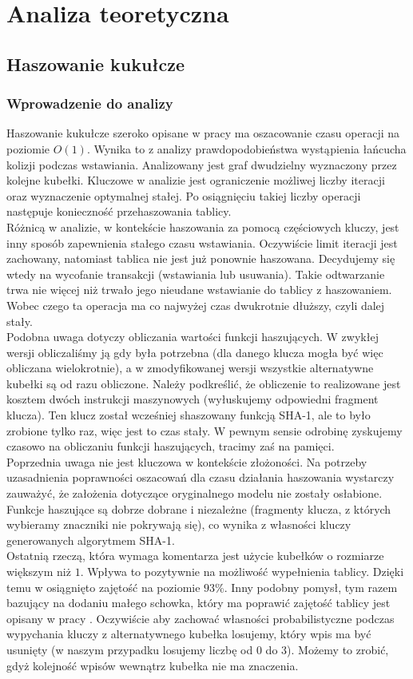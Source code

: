 \documentclass[declaration,shortabstract,masc]{iithesis}
\begin{document}
	\chapter{Analiza teoretyczna}
		\section{Haszowanie kukułcze}
			\subsection{Wprowadzenie do analizy}
				Haszowanie kukułcze szeroko opisane w pracy \cite{CH} ma oszacowanie czasu operacji na poziomie $O(1)$. Wynika to z analizy prawdopodobieństwa wystąpienia łańcucha kolizji podczas wstawiania. Analizowany jest graf dwudzielny wyznaczony przez kolejne kubełki. Kluczowe w analizie jest ograniczenie możliwej liczby iteracji oraz wyznaczenie optymalnej stałej. Po osiągnięciu takiej liczby operacji następuje konieczność przehaszowania tablicy.\\
				\indent Różnicą w analizie, w kontekście haszowania za pomocą częściowych kluczy, jest inny sposób zapewnienia stałego czasu wstawiania. Oczywiście limit iteracji jest zachowany, natomiast tablica nie jest już ponownie haszowana. Decydujemy się wtedy na wycofanie transakcji (wstawiania lub usuwania). Takie odtwarzanie trwa nie więcej niż trwało jego nieudane wstawianie do tablicy z haszowaniem. Wobec czego ta operacja ma co najwyżej czas dwukrotnie dłuższy, czyli dalej stały.\\
				\indent Podobna uwaga dotyczy obliczania wartości funkcji haszujących. W zwykłej wersji obliczaliśmy ją gdy była potrzebna (dla danego klucza mogła być więc obliczana wielokrotnie), a w zmodyfikowanej wersji wszystkie alternatywne kubełki są od razu obliczone. Należy podkreślić, że obliczenie to realizowane jest kosztem dwóch instrukcji maszynowych (wyłuskujemy odpowiedni fragment klucza). Ten klucz został wcześniej shaszowany funkcją SHA-1, ale to było zrobione tylko raz, więc jest to czas stały. W pewnym sensie odrobinę zyskujemy czasowo na obliczaniu funkcji haszujących, tracimy zaś na pamięci.\\
				\indent Poprzednia uwaga nie jest kluczowa w kontekście złożoności. Na potrzeby uzasadnienia poprawności oszacowań dla czasu działania haszowania wystarczy zauważyć, że założenia dotyczące oryginalnego modelu nie zostały osłabione. Funkcje haszujące są dobrze dobrane i niezależne (fragmenty klucza, z których wybieramy znaczniki nie pokrywają się), co wynika z własności kluczy generowanych algorytmem SHA-1.\\
				\indent Ostatnią rzeczą, która wymaga komentarza jest użycie kubełków o rozmiarze większym niż $1$. Wpływa to pozytywnie na możliwość wypełnienia tablicy. Dzięki temu w \cite{SILT} osiągnięto zajętość na poziomie $93$\%. Inny podobny pomysł, tym razem bazujący na dodaniu małego schowka, który ma poprawić zajętość tablicy jest opisany w pracy \cite{CHwS}. Oczywiście aby zachować własności probabilistyczne podczas wypychania kluczy z alternatywnego kubełka losujemy, który wpis ma być usunięty (w naszym przypadku losujemy liczbę od $0$ do $3$). Możemy to zrobić, gdyż kolejność wpisów wewnątrz kubełka nie ma znaczenia.
\end{document}
